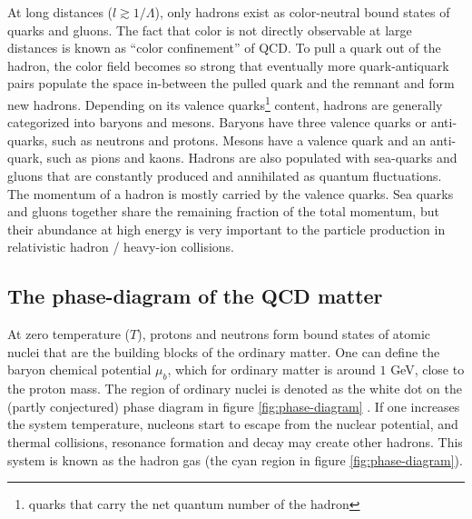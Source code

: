 At long distances ($l \gtrsim 1/\Lambda$), only hadrons exist as color-neutral bound states of quarks and gluons.
The fact that color is not directly observable at large distances is known as ``color confinement'' of QCD. 
To pull a quark out of the hadron, the color field becomes so strong that eventually more quark-antiquark pairs populate the space in-between the pulled quark and the remnant and form new hadrons.
Depending on its valence quarks\footnote{\singlespacing quarks that carry the net quantum number of the hadron} content, hadrons are generally categorized into baryons and mesons.
Baryons have three valence quarks or anti-quarks, such as neutrons and protons.
Mesons have a valence quark and an anti-quark, such as pions and kaons.
Hadrons are also populated with sea-quarks and gluons that are constantly produced and annihilated as quantum fluctuations.
The momentum of a hadron is mostly carried by the valence quarks.
Sea quarks and gluons together share the remaining fraction of the total momentum, but their abundance at high energy is very important to the particle production in relativistic hadron / heavy-ion collisions.

\subsection{The phase-diagram of the QCD matter}
At zero temperature ($T$), protons and neutrons form bound states of atomic nuclei that are the building blocks of the ordinary matter.
One can define the baryon chemical potential $\mu_b$, which for ordinary matter is around $1$ GeV, close to the proton mass.
The region of ordinary nuclei is denoted as the white dot on the (partly conjectured) phase diagram in figure \ref{fig:phase-diagram} \cite{Geesaman:2015fha}.
If one increases the system temperature, nucleons start to escape from the nuclear potential, and thermal collisions, resonance formation and decay may create other hadrons.
This system is known as the hadron gas (the cyan region in figure \ref{fig:phase-diagram}).


